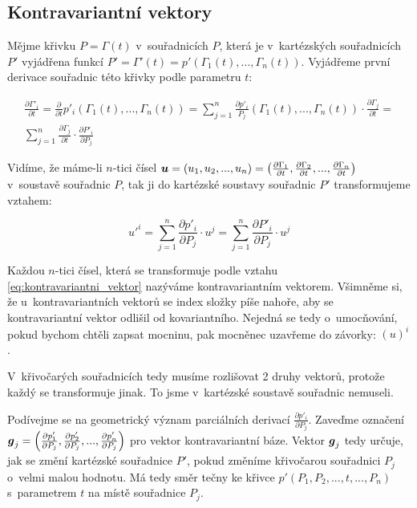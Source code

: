 \subsection{Kontravariantní vektory}

Mějme křivku \(P = \Gamma(t)\) v~souřadnicích \(P\), která je v~kartézských souřadnicích \(P'\) vyjádřena funkcí \(P' = \Gamma'(t) = p'(\Gamma_1(t), ..., \Gamma_n(t))\). Vyjádřeme první derivace souřadnic této křivky podle parametru \(t\):

\begin{equation}
\begin{split}
\frac{\partial \Gamma'_i}{\partial t} = \frac{\partial}{\partial t} p'_i(\Gamma_1(t), ..., \Gamma_n(t)) = \sum_{j=1}^n \frac{\partial p'_i}{P_j} (\Gamma_1(t), ..., \Gamma_n(t)) \cdot \frac{\partial \Gamma_j}{\partial t} = \\
\sum_{j=1}^n \frac{\partial \Gamma_j}{\partial t} \cdot \frac{\partial P'_i}{\partial P_j}
\end{split}
\end{equation}

Vidíme, že máme-li \(n\)-tici čísel \(\boldsymbol{u} = (u_1, u_2, ..., u_n) = \left( \frac{\partial \Gamma_1}{\partial t}, \frac{\partial \Gamma_2}{\partial t}, ..., \frac{\partial \Gamma_n}{\partial t} \right)\) v~soustavě souřadnic \(P\), tak ji do kartézské soustavy souřadnic \(P'\) transformujeme vztahem:

\begin{equation}
\label{eq:kontravariantni_vektor}
u'^i = \sum_{j=1}^n \frac{\partial p'_i}{\partial P_j} \cdot u^j = \sum_{j=1}^n \frac{\partial P'_i}{\partial P_j} \cdot u^j
\end{equation}

Každou \(n\)-tici čísel, která se transformuje podle vztahu \eqref{eq:kontravariantni_vektor} nazýváme kontravariantním vektorem. Všimněme si, že u~kontravariantních vektorů se index složky píše nahoře, aby se kontravariantní vektor odlišil od kovariantního. Nejedná se tedy o~umocňování, pokud bychom chtěli zapsat mocninu, pak mocněnec uzavřeme do závorky: \((u)^i\).

V~křivočarých souřadnicích tedy musíme rozlišovat 2 druhy vektorů, protože každý se transformuje jinak. To jsme v~kartézské soustavě souřadnic nemuseli.

Podívejme se na geometrický význam parciálních derivací \(\frac{\partial p'_i}{\partial P_j}\). Zaveďme označení \(\boldsymbol{g}_j = \left(\frac{\partial p'_1}{\partial P_j}, \frac{\partial p'_2}{\partial P_j}, ..., \frac{\partial p'_n}{\partial P_j}\right)\) pro vektor kontravariantní báze. Vektor \(\boldsymbol{g}_j\) tedy určuje, jak se změní kartézské souřadnice \(P'\), pokud změníme křivočarou souřadnici \(P_j\) o~velmi malou hodnotu. Má tedy směr tečny ke křivce \(p'(P_1, P_2, ..., t, ..., P_n)\) s~parametrem \(t\) na místě souřadnice \(P_j\).

